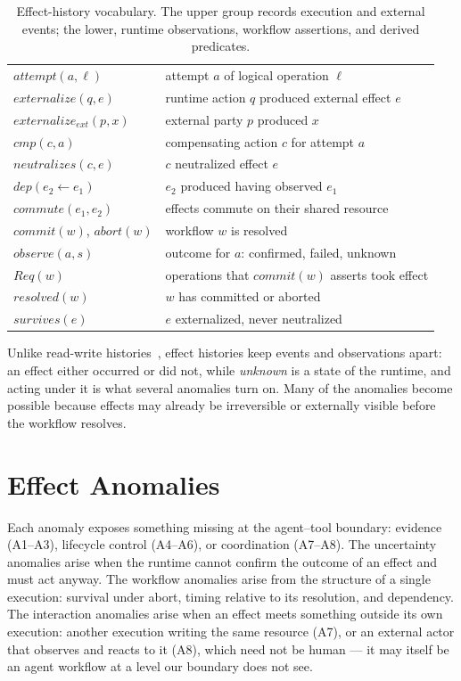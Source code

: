 \documentclass{article}
\begin{document}
\begin{table}[t]
\centering
\renewcommand{\arraystretch}{1.15}
\footnotesize
\caption{Effect-history vocabulary. The upper group records execution and
external events; the lower, runtime observations, workflow assertions, and
derived predicates.}
\label{tab:model}
\begin{tabularx}{\linewidth}{@{}l X@{}}
\toprule
$attempt(a, \ell)$ & attempt $a$ of logical operation $\ell$ \\
$externalize(q, e)$ & runtime action $q$ produced external effect $e$ \\
$externalize_{\mathit{ext}}(p, x)$ & external party $p$ produced $x$ \\
$cmp(c, a)$ & compensating action $c$ for attempt $a$ \\
$neutralizes(c, e)$ & $c$ neutralized effect $e$ \\
$dep(e_2 \leftarrow e_1)$ & $e_2$ produced having observed $e_1$ \\
$commute(e_1, e_2)$ & effects commute on their shared resource \\
$commit(w)$, $abort(w)$ & workflow $w$ is resolved \\
\midrule
$observe(a, s)$ & outcome for $a$: confirmed, failed, unknown \\
$Req(w)$ & operations that $commit(w)$ asserts took effect \\
$resolved(w)$ & $w$ has committed or aborted \\
$survives(e)$ & $e$ externalized, never neutralized \\
\bottomrule
\end{tabularx}
\end{table}

Unlike read-write histories~\cite{adya1999}, effect histories keep events
and observations apart: an effect either occurred or did not, while
\emph{unknown} is a state of the runtime, and acting under it is what
several anomalies turn on. Many of the anomalies become possible because
effects may already be irreversible or externally visible before the
workflow resolves.

\section{Effect Anomalies}
\label{sec:catalog}

Each anomaly exposes something missing at the agent--tool boundary:
evidence (A1--A3), lifecycle control (A4--A6), or coordination (A7--A8).
The uncertainty anomalies arise when the runtime cannot confirm the outcome
of an effect and must act anyway. The workflow anomalies arise from the structure of a single
execution: survival under abort, timing relative to its resolution, and
dependency. The interaction anomalies arise when an effect meets something
outside its own execution: another execution writing the same resource (A7),
or an external actor that observes and reacts to it (A8), which need not be
human --- it may itself be an agent workflow at a level our boundary does not
see.
\end{document}
